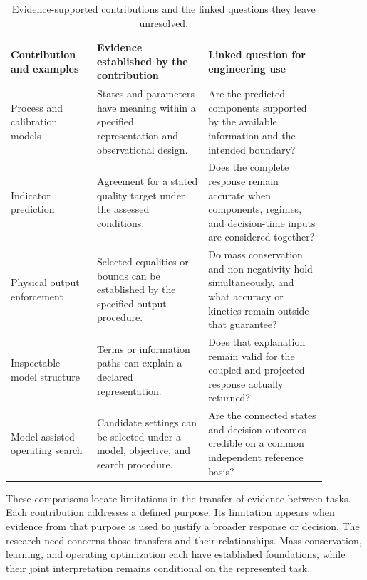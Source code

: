 \begin{table}[htbp]
\centering\footnotesize
\caption{Evidence-supported contributions and the linked questions they leave unresolved.}
\label{tab:rrl_evidence_gap_matrix}
\begin{tabular}{>{\raggedright\arraybackslash}p{0.24\linewidth}>{\raggedright\arraybackslash}p{0.31\linewidth}>{\raggedright\arraybackslash}p{0.33\linewidth}}
\toprule Contribution and examples & Evidence established by the contribution & Linked question for engineering use\\\midrule
Process and calibration models\newline\citep{Hauduc2013,Machado2014} & States and parameters have meaning within a specified representation and observational design. & Are the predicted components supported by the available information and the intended boundary?\\
Indicator prediction\newline\citep{Ching2022,Wang2025} & Agreement for a stated quality target under the assessed conditions. & Does the complete response remain accurate when components, regimes, and decision-time inputs are considered together?\\
Physical output enforcement\newline\citep{Beucler2021,KircherVotsmeier2025} & Selected equalities or bounds can be established by the specified output procedure. & Do mass conservation and non-negativity hold simultaneously, and what accuracy or kinetics remain outside that guarantee?\\
Inspectable model structure\newline\citep{Rudin2019,Shen2023} & Terms or information paths can explain a declared representation. & Does that explanation remain valid for the coupled and projected response actually returned?\\
Model-assisted operating search\newline\citep{Durkin2024,Pedrozo2025} & Candidate settings can be selected under a model, objective, and search procedure. & Are the connected states and decision outcomes credible on a common independent reference basis?\\
\bottomrule
\end{tabular}
\end{table}

These comparisons locate limitations in the transfer of evidence between tasks. Each contribution addresses a defined purpose. Its limitation appears when evidence from that purpose is used to justify a broader response or decision. The research need concerns those transfers and their relationships. Mass conservation, learning, and operating optimization each have established foundations, while their joint interpretation remains conditional on the represented task.

